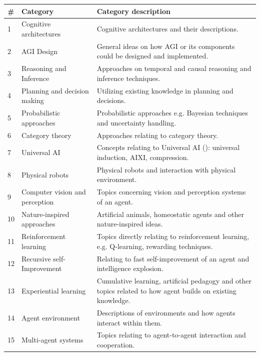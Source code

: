 \documentclass[utf8,english]{gradu3}
\begin{document}
\begin{table}[H]
  \footnotesize
  \centering
  \begin{tabular}{p{0.05\linewidth} p{0.30\linewidth} p{0.65\linewidth}}

    \textbf{\#} & \textbf{Category}  & \textbf{Category description}  \\ \hline
    1  & Cognitive architectures & Cognitive architectures and their descriptions.  \\ \hline
    2  & AGI Design & General ideas on how AGI or its components could be designed and implemented. \\ \hline
    3	 & Reasoning and Inference &  Approaches on temporal and causal reasoning and inference techniques. \\ \hline
    4	 & Planning and decision making & Utilizing existing knowledge in planning and decisions. \\ \hline
    5	 & Probabilistic approaches & Probabilistic approaches e.g. Bayesian techniques and uncertainty handling.\\ \hline
    6	 & Category theory & Approaches relating to category theory.\\ \hline
    7	 & Universal AI & Concepts relating to Universal AI (\cite{hutter2004}): universal induction, AIXI, compression.\\ \hline
    8	 & Physical robots & Physical robots and interaction with physical environment. \\ \hline
    9	 & Computer vision and perception & Topics concerning vision and perception systems of an agent.\\ \hline
    10 & Nature-inspired approaches & Artificial animals, homeostatic agents and other nature-inspired ideas.\\ \hline
    11 & Reinforcement learning & Topics directly relating to reinforcement learning, e.g. Q-learning, rewarding techniques.\\ \hline
    12 & Recursive self-Improvement & Relating to fast self-improvement of an agent and intelligence explosion. \\ \hline
    13 & Experiential learning & Cumulative learning, artificial pedagogy and other topics related to how agent builds on existing knowledge.\\ \hline
    14 & Agent environment & Descriptions of environments and how agents interact within them.\\ \hline
    15 & Multi-agent systems & Topics relating to agent-to-agent interaction and cooperation.\\ \hline

\end{tabular}
\end{table}
\end{document}
